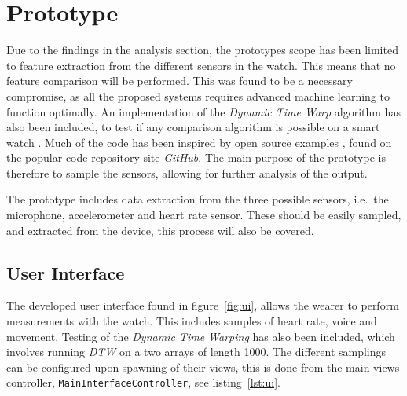 \section{Prototype}
Due to the findings in the analysis section, the prototypes scope has been
limited to feature extraction from the different sensors in the watch. This means
that no feature comparison will be performed. This was found to be a necessary
compromise, as all the proposed systems requires advanced machine learning to
function optimally. An implementation of the \textit{Dynamic Time Warp}
algorithm has also been included, to test if any comparison algorithm is
possible on a smart watch \cite{berndt1994using}.
Much of the code has been inspired by open source examples 
\cite{watchosheartratesamplerepo} \cite{healthkitheartrateexporter} 
\cite{watchossampler}, found on the popular code repository site \textit{GitHub}.
The main purpose of the prototype is therefore to sample the sensors, allowing
for further analysis of the output.

The prototype includes data extraction from the three possible sensors,
    i.e.\ the microphone, accelerometer and heart rate sensor. These should be
easily sampled, and extracted from the device, this process will also be
covered. 

\subsection{User Interface}
The developed user interface found in figure~\ref{fig:ui}, allows the wearer
to perform measurements with the watch. This includes samples of
heart rate, voice and movement. Testing of the \textit{Dynamic Time Warping} has
also been included, which involves running \textit{DTW} on a two arrays of
length 1000.
The different samplings can be configured upon spawning of their views, this is
done from the main views controller, \texttt{MainInterfaceController}, see
listing~\ref{lst:ui}.

